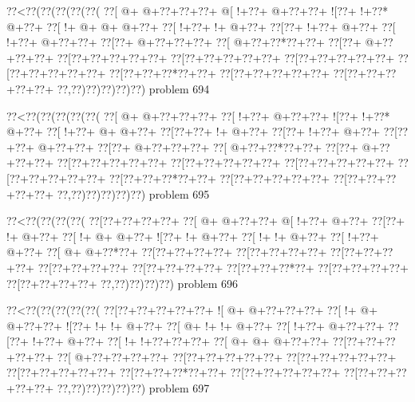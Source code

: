 \vbox{\vbox{\goo
\0??<\0??(\0??(\0??(\0??(\0??(
\0??[\- @+\- @+\0??+\0??+\0??+
\- @[\- !+\0??+\- @+\0??+\0??+
\- ![\0??+\- !+\0??*\- @+\0??+
\0??[\- !+\- @+\- @+\- @+\0??+
\0??[\- !+\0??+\- !+\- @+\0??+
\0??[\0??+\- !+\0??+\- @+\0??+
\0??[\- !+\0??+\- @+\0??+\0??+
\0??[\0??+\- @+\0??+\0??+\0??+
\0??[\- @+\0??+\0??*\0??+\0??+
\0??[\0??+\- @+\0??+\0??+\0??+
\0??[\0??+\0??+\0??+\0??+\0??+
\0??[\0??+\0??+\0??+\0??+\0??+
\0??[\0??+\0??+\0??+\0??+\0??+
\0??[\0??+\0??+\0??+\0??+\0??+
\0??[\0??+\0??+\0??*\0??+\0??+
\0??[\0??+\0??+\0??+\0??+\0??+
\0??[\0??+\0??+\0??+\0??+\0??+
\0??,\0??)\0??)\0??)\0??)\0??)
}
\hfil problem 694\hfil\break
}

\vbox{\vbox{\goo
\0??<\0??(\0??(\0??(\0??(\0??(
\0??[\- @+\- @+\0??+\0??+\0??+
\0??[\- !+\0??+\- @+\0??+\0??+
\- ![\0??+\- !+\0??*\- @+\0??+
\0??[\- !+\0??+\- @+\- @+\0??+
\0??[\0??+\0??+\- !+\- @+\0??+
\0??[\0??+\- !+\0??+\- @+\0??+
\0??[\0??+\0??+\- @+\0??+\0??+
\0??[\0??+\- @+\0??+\0??+\0??+
\0??[\- @+\0??+\0??*\0??+\0??+
\0??[\0??+\- @+\0??+\0??+\0??+
\0??[\0??+\0??+\0??+\0??+\0??+
\0??[\0??+\0??+\0??+\0??+\0??+
\0??[\0??+\0??+\0??+\0??+\0??+
\0??[\0??+\0??+\0??+\0??+\0??+
\0??[\0??+\0??+\0??*\0??+\0??+
\0??[\0??+\0??+\0??+\0??+\0??+
\0??[\0??+\0??+\0??+\0??+\0??+
\0??,\0??)\0??)\0??)\0??)\0??)
}
\hfil problem 695\hfil\break
}

\vbox{\vbox{\goo
\0??<\0??(\0??(\0??(\0??(
\0??[\0??+\0??+\0??+\0??+
\0??[\- @+\- @+\0??+\0??+
\- @[\- !+\0??+\- @+\0??+
\0??[\0??+\- !+\- @+\0??+
\0??[\- !+\- @+\- @+\0??+
\- ![\0??+\- !+\- @+\0??+
\0??[\- !+\- !+\- @+\0??+
\0??[\- !+\0??+\- @+\0??+
\0??[\- @+\- @+\0??*\0??+
\0??[\0??+\0??+\0??+\0??+
\0??[\0??+\0??+\0??+\0??+
\0??[\0??+\0??+\0??+\0??+
\0??[\0??+\0??+\0??+\0??+
\0??[\0??+\0??+\0??+\0??+
\0??[\0??+\0??+\0??*\0??+
\0??[\0??+\0??+\0??+\0??+
\0??[\0??+\0??+\0??+\0??+
\0??,\0??)\0??)\0??)\0??)
}
\hfil problem 696\hfil\break
}

\vbox{\vbox{\goo
\0??<\0??(\0??(\0??(\0??(\0??(
\0??[\0??+\0??+\0??+\0??+\0??+
\- ![\- @+\- @+\0??+\0??+\0??+
\0??[\- !+\- @+\- @+\0??+\0??+
\- ![\0??+\- !+\- !+\- @+\0??+
\0??[\- @+\- !+\- !+\- @+\0??+
\0??[\- !+\0??+\- @+\0??+\0??+
\0??[\0??+\- !+\0??+\- @+\0??+
\0??[\- !+\- !+\0??+\0??+\0??+
\0??[\- @+\- @+\- @+\0??+\0??+
\0??[\0??+\0??+\0??+\0??+\0??+
\0??[\- @+\0??+\0??+\0??+\0??+
\0??[\0??+\0??+\0??+\0??+\0??+
\0??[\0??+\0??+\0??+\0??+\0??+
\0??[\0??+\0??+\0??+\0??+\0??+
\0??[\0??+\0??+\0??*\0??+\0??+
\0??[\0??+\0??+\0??+\0??+\0??+
\0??[\0??+\0??+\0??+\0??+\0??+
\0??,\0??)\0??)\0??)\0??)\0??)
}
\hfil problem 697\hfil\break
}


